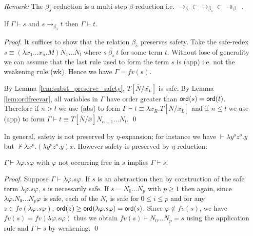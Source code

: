 \documentclass{llncs}
\newcommand\betared{\rightarrow_\beta}
\newcommand\betasred{\rightarrow_{\beta_s}}
\newcommand\betaredtr{\twoheadrightarrow_\beta} %
\newcommand\subst[2]{\left[ #1/#2 \right]}
\begin{document}
\noindent \emph{Remark:} The $\beta_s$-reduction is a multi-step
$\beta$-reduction i.e. $\betared \subset \betasred \subset
\betaredtr$\ .


\begin{lemma}
\label{lem:safered_preserve_safety}
If $\Gamma \vdash s$ and $s \betasred t$ then $\Gamma \vdash t$.
\end{lemma}

\begin{proof}
  It suffices to show that the relation $\beta_s$ preserves safety.
  Take the safe-redex $ s \equiv (\lambda x_1 \ldots x_n . M) N_1
  \ldots N_l $ where $s\ \beta_s\ t$ for some term $t$.  Without lose of generality we can assume that the last rule
  used to form the term $s$ is {\sf(app)} i.e. not the weakening rule
  {\sf(wk)}. Hence we have $\Gamma = fv(s)$.

  By Lemma \ref{lem:subst_preserve_safety},
  $T\subst{\overline{N}}{\overline{x_L}}$ is safe.  By Lemma
  \ref{lem:ordfreevar}, all variables in $\Gamma$ have order greater
  than ${\sf ord}(s) = {\sf ord}(t)$. Therefore if $n>l$ we use
  {\sf(abs)} to form $\Gamma \vdash t \equiv \lambda
  \overline{x_R}. T\subst{\overline{N}}{\overline{x_L}}$ and if $n
  \leq l$ we use {\sf(app)} to form $\Gamma \vdash t
  \equiv T\subst{\overline{N}}{\overline{x}} N_{n+1} \ldots N_l$.
  \qed
\end{proof}

In general, safety is not preserved by $\eta$-expansion; for instance
we have
$\vdash \lambda y^o z^o . y$ but
$\not \vdash \lambda x^o . (\lambda y^o z^o . y) x$.
However safety is preserved by $\eta$-reduction:

\begin{lemma}
  $\Gamma \vdash \lambda \varphi . s \varphi $ with $\varphi$ not
  occurring free in $s$ implies $\Gamma \vdash s$.
\end{lemma}
\begin{proof}
  Suppose $\Gamma \vdash \lambda \varphi . s \varphi $. If $s$ is an
  abstraction then by construction of the safe term $\lambda \varphi
  . s \varphi$, $s$ is necessarily safe.  If $s = N_0 \ldots N_p$ with
  $p\geq 1$ then again, since $\lambda \varphi . N_0 \ldots N_p
  \varphi$ is safe, each of the $N_i$ is safe for $0 \leq i \leq p$
  and for any $z\in fv(\lambda \varphi . s \varphi)$, ${\sf ord}(z) \geq
  {\sf ord}(\lambda \varphi . s \varphi) = {\sf ord}(s)$. Since $\varphi \not\in
  fv(s)$, we have $fv(s) = fv(\lambda \varphi . s \varphi)$ thus we
  obtain $fv(s) \vdash N_0 \ldots N_p = s$ using the application rule
  and $\Gamma \vdash s$ by weakening. \qed
\end{proof}
\end{document}
